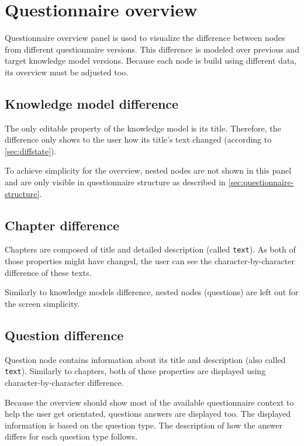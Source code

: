\section{Questionnaire overview}\label{sec:questionnaire-overview}

Questionnaire overview panel is used to visualize the difference between nodes from different questionnaire versions.
This difference is modeled over previous and target knowledge model versions.
Because each node is build using different data, its overview must be adjusted too.

\subsection{Knowledge model difference}

The only editable property of the knowledge model is its title.
Therefore, the difference only shows to the user how its title's text changed (according to \ref{sec:diffstate}).

To achieve simplicity for the overview, nested nodes are not shown in this panel and are only visible in questionnaire structure as described in \ref{sec:questionnaire-structure}.

\subsection{Chapter difference}

Chapters are composed of title and detailed description (called \texttt{text}).
As both of those properties might have changed, the user can see the character-by-character difference of these texts.

Similarly to knowledge models difference, nested nodes (questions) are left out for the screen simplicity.

\subsection{Question difference}

Question node contains information about its title and description (also called \texttt{text}).
Similarly to chapters, both of these properties are displayed using character-by-character difference.

Because the overview should show most of the available questionnaire context to help the user get orientated, questions answers are displayed too.
The displayed information is based on the question type.
The description of how the answer differs for each question type follows.

